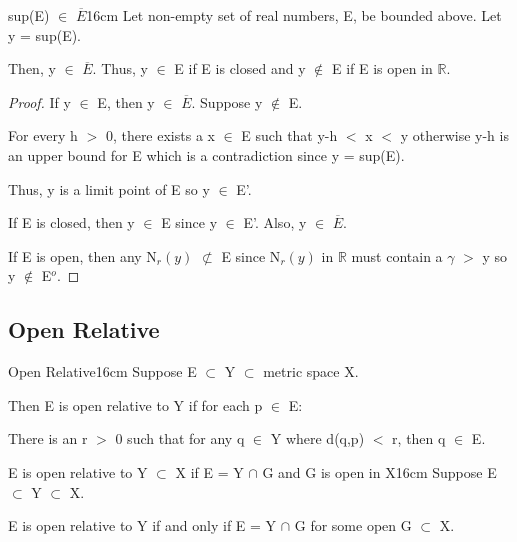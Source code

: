 	\vspace{0.5cm}



	\begin{wtheorem}{sup(E) $\in$ $\overline{E}$}{16cm}
		Let non-empty set of real numbers, E, be bounded above.
        Let y = sup(E).
		
		Then, y $\in$ $\overline{E}$.
        Thus, y $\in$ E if E is closed
		and y $\not \in$ E if E is open in $\mathbb{R}$.
	\end{wtheorem}
	
	\begin{proof}
		If y $\in$ E, then y $\in$ $\overline{E}$. Suppose y $\not \in$ E.

		For every h $>$ 0, there exists a x $\in$ E such that y-h $<$ x $<$ y
		otherwise y-h is an upper bound for E which is a contradiction
		since y = sup(E).

		Thus, y is a limit point of E so y $\in$ E'.

		If E is closed, then y $\in$ E since y $\in$ E'.	
		Also, y $\in$ $\overline{E}$.
		
		If E is open, then any N$_r(y)$ $\not \subset$ E since 
		N$_r(y)$ in $\mathbb{R}$ must contain a $\gamma$ $>$ y
		so y $\not \in$ E$^o$.
	\end{proof}

	\vspace{0.5cm}





\subsection{ Open Relative }

	\begin{definition}{Open Relative}{16cm}
		Suppose E $\subset$ Y $\subset$ metric space X.

		Then E is open relative to Y if for each p $\in$ E:
		
		\hspace{1cm}
		There is an r $>$ 0 such that for any q $\in$ Y where d(q,p) $<$ r,
		then q $\in$ E.
	\end{definition}
	
	\newpage



	\begin{wtheorem}{E is open relative to Y $\subset$ X
	if E = Y $\cap$ G and G is open in X}{16cm}
	Suppose E $\subset$ Y $\subset$ X.

	E is open relative to Y if and only if E = Y $\cap$ G
	for some open G $\subset$ X.
	\end{wtheorem}
	
